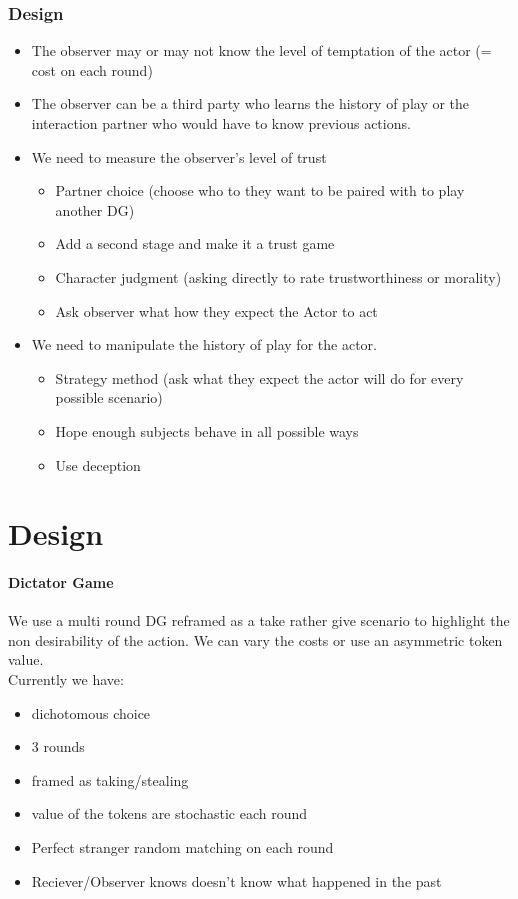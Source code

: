 \documentclass[11pt]{article}
\theoremstyle{plainCl1}
\begin{document}
\subsubsection{Design}

\begin{itemize}
    \item The observer may or may not know the level of temptation of the actor (= cost on each round)
    \item The observer can be a third party who learns the history of play or the interaction partner who would have to know previous actions. 
    \item We need to measure the observer's level of trust
    	\begin{itemize}
	\item Partner choice (choose who to they want to be paired with to play another DG)
	\item Add a second stage and make it a trust game
    	\item Character judgment (asking directly to rate trustworthiness or morality)
	\item Ask observer what how they expect the Actor to act
    	\end{itemize}
    \item We need to manipulate the history of play for the actor. 
    	\begin{itemize}
	\item Strategy method (ask what they expect the actor will do for every possible scenario)
	\item Hope enough subjects behave in all possible ways
    	\item Use deception
    	\end{itemize}
\end{itemize}

\section{Design}

\paragraph{Dictator Game}
We use a multi round DG reframed as a take rather give scenario to highlight the non desirability of the action.
We can vary the costs or use an asymmetric token value.\\
Currently we have:
\begin{itemize}
    \item dichotomous choice
    \item 3 rounds
    \item framed as taking/stealing
    \item value of the tokens are stochastic each round
    \item Perfect stranger random matching on each round
    \item Reciever/Observer knows doesn't know what happened in the past
\end{itemize}
\end{document}
